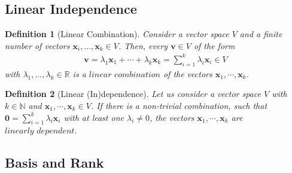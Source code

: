 \documentclass{article}
\newtheorem{definition}{Definition}[section]
\begin{document}
	\subsection{Linear Independence}
	\begin{definition}[Linear Combination]
		\normalfont	Consider a vector space $\textit{V}$ and a finite number of vectors $\boldsymbol{x}_i,\ldots,\boldsymbol{x}_k \in \textit{V}$. Then, every $\boldsymbol{v} \in \textit{V}$ of the form
		\begin{align}
			\boldsymbol{v} = \lambda_1\boldsymbol{x}_1 + \cdots + \lambda_k\boldsymbol{x}_k =  \sum_{i=1}^{k} \lambda_i\boldsymbol{x}_i \in \textit{V}
		\end{align}
		with $\lambda_1,\ldots,\lambda_k \in \mathbb{R}$ is a $\textit{linear combination}$ of the vectors $\boldsymbol{x}_1,\cdots,\boldsymbol{x}_k$.
	\end{definition}
	\begin{definition}[Linear (In)dependence]
		\normalfont Let us consider a vector space $\textit{V}$ with $k \in \mathbb{N}$ and  $\boldsymbol{x}_1,\cdots,\boldsymbol{x}_k \in \mathit{V}$. If there is a non-trivial combination, such that $\textbf{0} = \sum_{i=1}^{k} \lambda_i\boldsymbol{x}_i$ with at least one $\lambda_i \ne 0$, the vectors  $\boldsymbol{x}_1,\cdots,\boldsymbol{x}_k$ are $\textit{linearly dependent}$. 
	\end{definition}
	\subsection{Basis and Rank}
\end{document}
